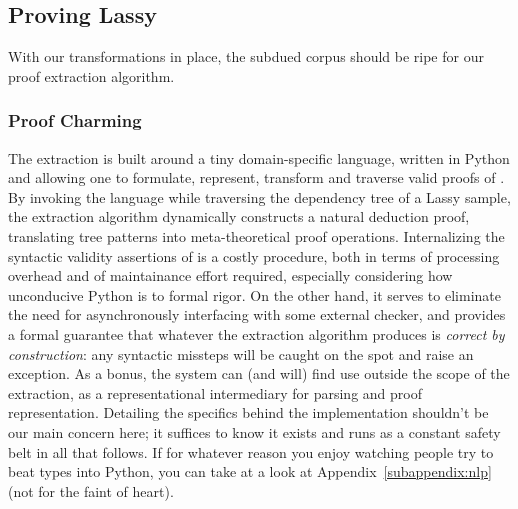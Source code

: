 \subsection{Proving Lassy}
With our transformations in place, the subdued corpus should be ripe for our proof extraction algorithm.

\subsubsection{Proof Charming}
The extraction is built around a tiny domain-specific language, written in Python and allowing one to formulate, represent, transform and traverse valid proofs of \NLPplus.
By invoking the language while traversing the dependency tree of a Lassy sample, the extraction algorithm dynamically constructs a natural deduction proof, translating tree patterns into meta-theoretical proof operations.
Internalizing the syntactic validity assertions of \NLPplus{} is a costly procedure, both in terms of processing overhead and of maintainance effort required, especially considering how unconducive Python is to formal rigor.
On the other hand, it serves to eliminate the need for asynchronously interfacing with some external checker, and provides a formal guarantee that whatever the extraction algorithm produces is \textit{correct by construction}: any syntactic missteps will be caught on the spot and raise an exception.
As a bonus, the system can (and will) find use outside the scope of the extraction, as a representational intermediary for parsing and proof representation.
Detailing the specifics behind the implementation shouldn't be our main concern here; it suffices to know it exists and runs as a constant safety belt in all that follows.
If for whatever reason you enjoy watching people try to beat types into Python, you can take at a look at Appendix~\ref{subappendix:nlp} (not for the faint of heart).

